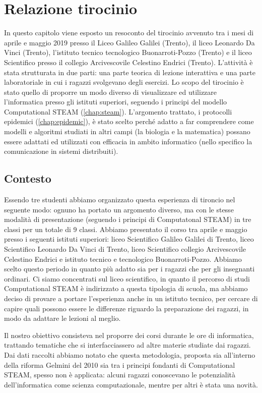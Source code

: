 \newpage
\chapter{Relazione tirocinio}
\label{cha:conclusioni}


In questo capitolo viene esposto un resoconto del tirocinio avvenuto tra i mesi di aprile e maggio 2019 presso il Liceo Galileo Galilei (Trento), il liceo Leonardo Da Vinci (Trento), l’istituto tecnico tecnologico Buonarroti-Pozzo (Trento) e il liceo Scientifico presso il collegio Arcivescovile Celestino Endrici (Trento). L’attività è stata strutturata in due parti: una parte teorica di lezione interattiva e una parte laboratoriale in cui i ragazzi svolgevano degli esercizi. Lo scopo del tirocinio è stato quello di proporre un modo diverso di visualizzare ed utilizzare l’informatica presso gli istituti superiori, seguendo i principi del modello Computational STEAM (\autoref{chap:steam}). L’argomento trattato, i protocolli epidemici (\autoref{chap:epidemic}), è stato scelto perché adatto a far comprendere come modelli e algoritmi studiati in altri campi (la biologia e la matematica) possano essere adattati ed utilizzati con efficacia in ambito informatico (nello specifico la comunicazione in sistemi distribuiti).
\section{Contesto}
Essendo tre studenti abbiamo organizzato questa esperienza di tironcio nel seguente modo: ognuno ha portato un argomento diverso, ma con le stesse modalità di presentazione (seguendo i principi di Computatonal STEAM) in tre classi per un totale di 9 classi.
Abbiamo presentato il corso tra aprile e maggio presso i seguenti istituti superiori: liceo Scientifico Galileo Galilei di Trento, liceo Scientifico Leonardo Da Vinci di Trento, liceo Scientifico collegio Arcivescovile Celestino Endrici e istituto tecnico e tecnologico Buonarroti-Pozzo. Abbiamo scelto questo periodo in quanto più adatto sia per i ragazzi che per gli insegnanti ordinari. Ci siamo concentrati sul liceo scientifico, in quanto il percorso di studi Computational STEAM è indirizzato a questa tipologia di scuola, ma abbiamo deciso di provare a portare l’esperienza anche in un istituto tecnico, per cercare di capire quali possono essere le differenze riguardo la preparazione dei ragazzi, in modo da adattare le lezioni al meglio. 

Il nostro obiettivo consisteva nel proporre dei corsi durante le ore di informatica, trattando tematiche che si interfacciassero ad altre materie studiate dai ragazzi. Dai dati raccolti abbiamo notato che questa metodologia, proposta sia all'interno della riforma Gelmini del 2010 \cite{riforma} sia tra i principi fondanti di Computational STEAM, spesso non è applicata: alcuni ragazzi conoscevano le potenzialità dell'informatica come scienza computazionale, mentre per altri è stata una novità. 

